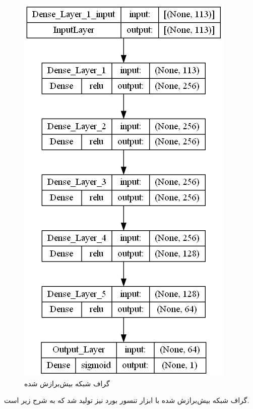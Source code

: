 \documentclass{article}
\begin{document}
\begin{figure}[!h]
    \centering\includegraphics[scale=.55]{./p6-5}
    \caption{گراف شبکه بیش‌برازش شده}\label{fig.65}
\end{figure}

گراف شبکه بیش‌برازش شده با ابزار تنسور بورد نیز تولید شد که به شرح زیر است.
\end{document}
